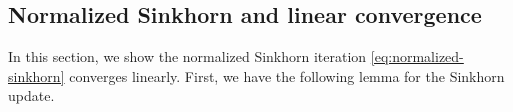 \documentclass{article}
\theoremstyle{plain}
\newtheorem*{lemma*}{Lemma}
\theoremstyle{remark}
\begin{document}


\subsection{Normalized Sinkhorn and linear convergence}
\label{app:normalized-sinkhorn}
In this section, we show the normalized Sinkhorn iteration \eqref{eq:normalized-sinkhorn} converges linearly.
First, we have the following lemma for the Sinkhorn update.
\end{document}
